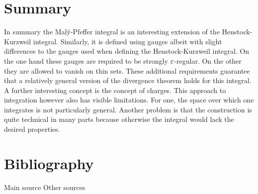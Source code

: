%

\section{Summary}

In summary the Malý-Pfeffer integral is an interesting extension of the Henstock-Kurzweil integral. Similarly, it is defined using gauges albeit with slight differences to the gauges used when defining the Henstock-Kurzweil integral. On the one hand these gauges are required to be strongly $\varepsilon$-regular. On the other they are allowed to vanish on thin sets. These additional requirements guarantee that a relatively general version of the divergence theorem holds for this integral. A further interesting concept is the concept of charges. This approach to integration however also has visible limitations. For one, the space over which one integrates is not particularly general. Another problem is that the construction is quite technical in many parts because otherwise the integral would lack the desired properties.

\newpage
\section*{Bibliography}
\nocite{*}
Main source
\printbibliography[heading=none, keyword={main}]
\noindent Other sources
\printbibliography[heading=none, keyword={secondary}]


